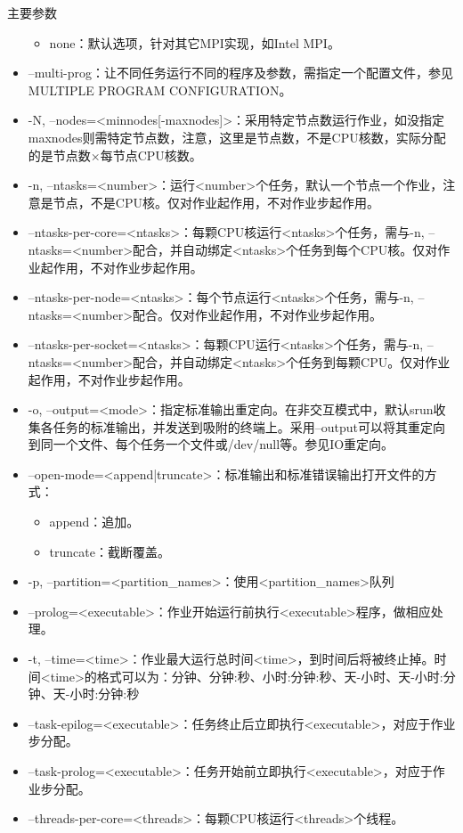 \begin{frame}{主要参数}
\begin{itemize}
\begin{itemize}
	\item none：默认选项，针对其它MPI实现，如Intel MPI。
\end{itemize}
\item --multi-prog：让不同任务运行不同的程序及参数，需指定一个配置文件，参见MULTIPLE PROGRAM CONFIGURATION。
\item -N, --nodes=<minnodes[-maxnodes]>：采用特定节点数运行作业，如没指定maxnodes则需特定节点数，注意，这里是节点数，不是CPU核数，实际分配的是节点数×每节点CPU核数。
\item -n, --ntasks=<number>：运行<number>个任务，默认一个节点一个作业，注意是节点，不是CPU核。仅对作业起作用，不对作业步起作用。
\item --ntasks-per-core=<ntasks>：每颗CPU核运行<ntasks>个任务，需与-n, --ntasks=<number>配合，并自动绑定<ntasks>个任务到每个CPU核。仅对作业起作用，不对作业步起作用。
\item --ntasks-per-node=<ntasks>：每个节点运行<ntasks>个任务，需与-n, --ntasks=<number>配合。仅对作业起作用，不对作业步起作用。
\item --ntasks-per-socket=<ntasks>：每颗CPU运行<ntasks>个任务，需与-n, --ntasks=<number>配合，并自动绑定<ntasks>个任务到每颗CPU。仅对作业起作用，不对作业步起作用。
\item -o, --output=<mode>：指定标准输出重定向。在非交互模式中，默认srun收集各任务的标准输出，并发送到吸附的终端上。采用--output可以将其重定向到同一个文件、每个任务一个文件或/dev/null等。参见IO重定向。
\item --open-mode=<append|truncate>：标准输出和标准错误输出打开文件的方式：
\begin{itemize}
	\item append：追加。
	\item truncate：截断覆盖。
\end{itemize}
\item -p, --partition=<partition\_names>：使用<partition\_names>队列
\item --prolog=<executable>：作业开始运行前执行<executable>程序，做相应处理。
\item -t, --time=<time>：作业最大运行总时间<time>，到时间后将被终止掉。时间<time>的格式可以为：分钟、分钟:秒、小时:分钟:秒、天-小时、天-小时:分钟、天-小时:分钟:秒
\item --task-epilog=<executable>：任务终止后立即执行<executable>，对应于作业步分配。
\item --task-prolog=<executable>：任务开始前立即执行<executable>，对应于作业步分配。
\item --threads-per-core=<threads>：每颗CPU核运行<threads>个线程。

\end{itemize}
\end{frame}
